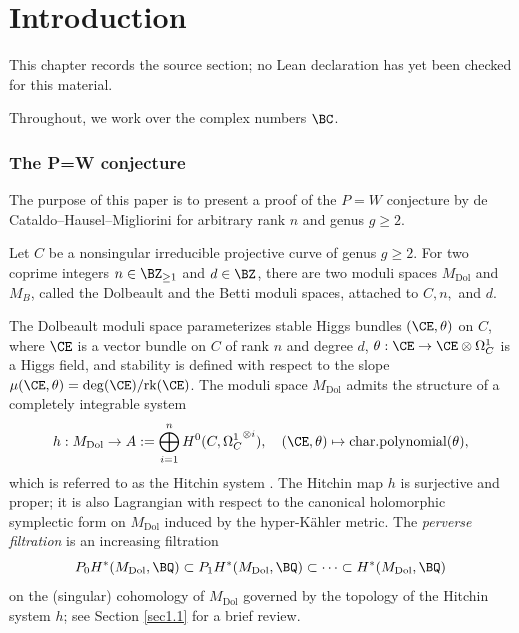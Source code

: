 \chapter{Introduction}
\label{pw-conjecture-gl-n-chapter-01}

\begin{remark}
\label{pw-conjecture-gl-n-chapter-01-source}
This chapter records the source section; no Lean declaration has yet been checked for this material.
\notready
\end{remark}

Throughout, we work over the complex numbers $\BC$.

\subsection{The P=W conjecture}
The purpose of this paper is to present a proof of the $P=W$ conjecture by de Cataldo--Hausel--Migliorini \cite{dCHM1} for arbitrary rank $n$ and genus $g \geq 2$.

Let $C$ be a nonsingular irreducible projective curve of genus $g \geq 2$. For two coprime integers $n \in \BZ_{\geq 1}$ and $d \in \BZ$, there are two moduli spaces $M_{\mathrm{Dol}}$ and $M_B$, called the Dolbeault and the Betti moduli spaces, attached to $C,n,$ and $d$.


The Dolbeault moduli space parameterizes stable Higgs bundles $(\CE, \theta)$ on $C$, where $\CE$ is a vector bundle on $C$ of rank $n$ and degree $d$, $\theta: \CE \to \CE \otimes \Omega_C^1$ is a Higgs field, and stability is defined with respect to the slope $\mu(\CE,\theta) ={\mathrm{deg}(\CE)}/{\mathrm{rk(\CE)}}$. The moduli space $M_{\mathrm{Dol}}$ admits the structure of a completely integrable system
\[
h: M_{\mathrm{Dol}} \to A := \bigoplus_{i=1}^n H^0(C, {\Omega_C^{1}}^{\otimes i}), \quad (\CE, \theta) \mapsto \mathrm{char.polynomial}(\theta),
\]
which is referred to as the Hitchin system \cite{Hit,Hit1}. The Hitchin map $h$ is surjective and proper; it is also Lagrangian with respect to the canonical holomorphic symplectic form on $M_{\mathrm{Dol}}$ induced by the hyper-K\"ahler metric. The \emph{perverse filtration} is an increasing filtration
\[
P_0H^*(M_{\mathrm{Dol}}, \BQ)\subset P_1H^*(M_{\mathrm{Dol}}, \BQ) \subset \cdots \subset H^*(M_{\mathrm{Dol}}, \BQ)
 \]
on the (singular) cohomology of $M_{\mathrm{Dol}}$ governed by the topology of the Hitchin system $h$; see Section \ref{sec1.1} for a brief review.

